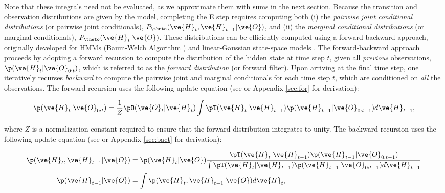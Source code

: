 \documentclass{article}
\begin{document}
\noindent Note that these integrals need not be evaluated, as we approximate them with sums in the next section. Because the transition and observation distributions are given by the model, completing the E step requires computing both (i) the \emph{pairwise joint conditional distributions} (or pairwise joint conditionals), $ P_{\theto} (\ve{H}_t,\ve{H}_{t-1} | \ve{O})$, and (ii) the \emph{marginal conditional distributions} (or marginal conditionals), $ P_{\theto} (\ve{H}_t |  \ve{O})$.  These distributions can be efficiently computed using a forward-backward approach, originally developed for HMMs (Baum-Welch Algorithm \cite{BaumWeiss70}) and linear-Gaussian state-space models \cite{Kalman60}.  The forward-backward approach proceeds by adopting a forward recursion to compute the distribution of the hidden state at time step $t$, given all \emph{previous} observations, $\p(\ve{H}_t | \ve{O}_{0:t})$, which is referred to as the \emph{forward distribution} (or forward filter).  Upon arriving at the final time step, one iteratively recurses \emph{backward} to compute the pairwise joint and marginal conditionals for each time step $t$, which are conditioned on \emph{all} the observations. The forward recursion uses the following update equation (see \cite{Rabiner89} or Appendix \ref{sec:for} for derivation):

\begin{align}\label{eq:for}
\p(\ve{H}_t|\ve{O}_{0:t}) = \frac{1}{Z} \pO(\ve{O}_t|\ve{H}_t) %
\int \pT(\ve{H}_t|\ve{H}_{t-1}) \p(\ve{H}_{t-1} | \ve{O}_{0:t-1}) d\ve{H}_{t-1},
\end{align}

\noindent where $Z$ is a normalization constant required to ensure that the forward distribution integrates to unity.  The backward recursion uses the following update equation (see \cite{ShumwayStoffer06} or Appendix \ref{sec:bact} for derivation):

\begin{subequations} \label{eq:back0}
\begin{align} \label{eq:joint}
\p(\ve{H}_t, \ve{H}_{t-1} | \ve{O}) &= %
\p (\ve{H}_t | \ve{O}) \frac{\pT (\ve{H}_t | \ve{H}_{t-1}) \p (\ve{H}_{t-1} | \ve{O}_{0:t-1})}{\int \pT (\ve{H}_t | \ve{H}_{t-1}) \p (\ve{H}_{t-1} | \ve{O}_{0:t-1}) d\ve{H}_{t-1} }
\\ \label{eq:marg} \p(\ve{H}_{t-1} | \ve{O}) &=  \int \p(\ve{H}_t, \ve{H}_{t-1} | \ve{O}) d\ve{H}_t,
\end{align}
\end{subequations}
\end{document}
